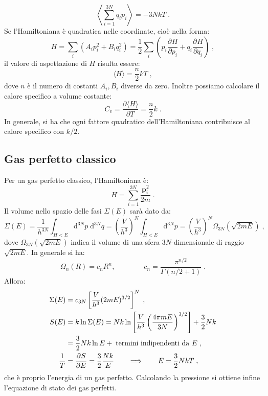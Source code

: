 \documentclass[10pt,a4paper]{report}
\theoremstyle{definition}
\newcommand{\pdev}[3][]{\frac{\partial^{#1} #2}{\partial #3^{#1}}}
\numberwithin{equation}{section}
\newcommand{\diff}[1][]{\mathrm{d}#1}
\newcommand{\bra}{\langle}
\newcommand{\ket}{\rangle}
\begin{document}
\begin{equation}
\left\langle \sum_{i=1}^{3N} q_i\dot{p}_i\right\rangle = -3NkT\;.
\end{equation}
Se l'Hamiltoniana è quadratica nelle coordinate, cioè nella forma:
\begin{equation}
H=\sum_i(A_ip_i^2+B_iq_i^2)=\frac{1}{2}\sum_i\left(p_i\pdev{H}{p_i}+q_i\pdev{H}{q_i}\right)\;,
\end{equation}
il valore di aspettazione di $H$ risulta essere:
\begin{equation}
\bra H\ket=\frac{n}{2}kT\;,
\end{equation}
dove $n$ è il numero di costanti $A_i,B_i$ diverse da zero. Inoltre possiamo calcolare il calore specifico a volume costante:
\begin{equation}
C_v=\pdev{\bra H\ket}{T}=\frac{n}{2}k\;.
\end{equation}
In generale, si ha che ogni fattore quadratico dell'Hamiltoniana contribuisce al calore specifico con $k/2$.
\subsection{Gas perfetto classico}
Per un gas perfetto classico, l'Hamiltoniana è:
\begin{equation}
H=\sum_{i=1}^{3N}\frac{\mathbf{p}_i^2}{2m}\;.
\end{equation}
Il volume nello spazio delle fasi $\Sigma(E)$ sarà dato da:
\begin{equation}
\Sigma(E)=\frac{1}{h^{3N}}\int_{H<E}\diff^{3N}{p}\;\diff^{3N}{q}=\left(\frac{V}{h^3}\right)^N\int_{H<E}\diff^{3N}{p}=\left(\frac{V}{h^3}\right)^N\Omega_{3N}(\sqrt{2mE})\;,
\end{equation}
dove $\Omega_{3N}(\sqrt{2mE})$ indica il volume di una sfera $3N$-dimensionale di raggio $\sqrt{2mE}$. In generale si ha:
\begin{equation}
\Omega_n(R)=c_n R^n,\qquad\qquad c_n=\frac{\pi^{n/2}}{\Gamma(n/2+1)}\;.
\end{equation}
Allora:
\begin{align}
\Sigma(E) &= c_{3N}\left[\frac{V}{h^3}(2mE)^{3/2}\right]^N\;, \\
S(E) &= k\ln\Sigma(E)=Nk\ln\left[\frac{V}{h^3}\left(\frac{4\pi mE}{3N}\right)^{3/2}\right]+\frac{3}{2}Nk  \notag \\
&= \frac{3}{2}Nk\ln E+\;\mbox{termini indipendenti da } E\;, \\
\frac{1}{T} &= \pdev{S}{E}=\frac{3}{2}\frac{Nk}{E}\qquad\Longrightarrow\qquad E=\frac{3}{2}NkT\;,
\end{align}
che è proprio l'energia di un gas perfetto. Calcolando la pressione si ottiene infine l'equazione di stato dei gas perfetti.
\end{document}
